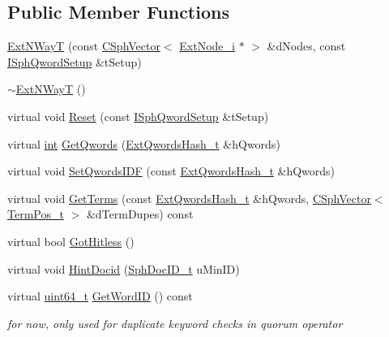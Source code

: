 \subsection*{Public Member Functions}
\begin{DoxyCompactItemize}
\item 
\hyperlink{classExtNWayT_aec7cc7ccae4e1aeff23d562c688ec85b}{Ext\-N\-Way\-T} (const \hyperlink{classCSphVector}{C\-Sph\-Vector}$<$ \hyperlink{classExtNode__i}{Ext\-Node\-\_\-i} $\ast$ $>$ \&d\-Nodes, const \hyperlink{classISphQwordSetup}{I\-Sph\-Qword\-Setup} \&t\-Setup)
\item 
\hyperlink{classExtNWayT_a80aff2211141000cf226cff964583250}{$\sim$\-Ext\-N\-Way\-T} ()
\item 
virtual void \hyperlink{classExtNWayT_aab7d8d51d29a7caeb907d4bb69ce1b53}{Reset} (const \hyperlink{classISphQwordSetup}{I\-Sph\-Qword\-Setup} \&t\-Setup)
\item 
virtual \hyperlink{sphinxexpr_8cpp_a4a26e8f9cb8b736e0c4cbf4d16de985e}{int} \hyperlink{classExtNWayT_a6117123f191ac13a9da57b6105c134d0}{Get\-Qwords} (\hyperlink{sphinxsearch_8cpp_a814fc096e1ffb29d072d79b72b702fe6}{Ext\-Qwords\-Hash\-\_\-t} \&h\-Qwords)
\item 
virtual void \hyperlink{classExtNWayT_a56f222f0327ad8d5f2494869933a1fe8}{Set\-Qwords\-I\-D\-F} (const \hyperlink{sphinxsearch_8cpp_a814fc096e1ffb29d072d79b72b702fe6}{Ext\-Qwords\-Hash\-\_\-t} \&h\-Qwords)
\item 
virtual void \hyperlink{classExtNWayT_a05bb2880bd86a4da7f2232d048361580}{Get\-Terms} (const \hyperlink{sphinxsearch_8cpp_a814fc096e1ffb29d072d79b72b702fe6}{Ext\-Qwords\-Hash\-\_\-t} \&h\-Qwords, \hyperlink{classCSphVector}{C\-Sph\-Vector}$<$ \hyperlink{structTermPos__t}{Term\-Pos\-\_\-t} $>$ \&d\-Term\-Dupes) const 
\item 
virtual bool \hyperlink{classExtNWayT_ae6777c57ad5dedc5d290a4962825fea6}{Got\-Hitless} ()
\item 
virtual void \hyperlink{classExtNWayT_ac07e76c34b876951d7d2c89cdc4cfc21}{Hint\-Docid} (\hyperlink{sphinx_8h_a3176771631c12a9e4897272003e6b447}{Sph\-Doc\-I\-D\-\_\-t} u\-Min\-I\-D)
\item 
virtual \hyperlink{sphinxstd_8h_aaa5d1cd013383c889537491c3cfd9aad}{uint64\-\_\-t} \hyperlink{classExtNWayT_a798963603e85baa31b6c5fbffcd5e8a4}{Get\-Word\-I\-D} () const 
\begin{DoxyCompactList}\small\item\em for now, only used for duplicate keyword checks in quorum operator \end{DoxyCompactList}\end{DoxyCompactItemize}
